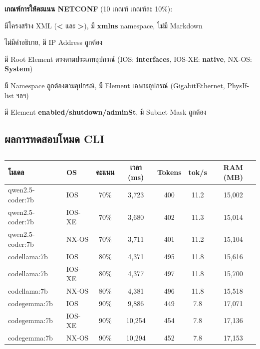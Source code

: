 \hspace*{1.3em}
\textbf{เกณฑ์การให้คะแนน NETCONF} (10 เกณฑ์ เกณฑ์ละ 10\%):
\begin{mycustomitem2}
    \item มีโครงสร้าง XML (\textbf{<} และ \textbf{>}), มี \textbf{xmlns} namespace, ไม่มี Markdown
    \item ไม่มีคำอธิบาย, มี IP Address ถูกต้อง
    \item มี Root Element ตรงตามประเภทอุปกรณ์ (IOS: \textbf{interfaces}, IOS-XE: \textbf{native}, NX-OS: \textbf{System})
    \item มี Namespace ถูกต้องตามอุปกรณ์, มี Element เฉพาะอุปกรณ์ (GigabitEthernet, PhysIf-list ฯลฯ)
    \item มี Element \textbf{enabled/shutdown/adminSt}, มี Subnet Mask ถูกต้อง
\end{mycustomitem2}

\subsection{ผลการทดสอบโหมด CLI}

\begin{table}[H]
    \caption{}
    \label{tab:benchmark-cli}
    \fontSixTeen
    \centering
    \begin{tabularx}{\textwidth}{|l|l|c|c|c|c|c|}
        \hline
        \textbf{โมเดล} & \textbf{OS} & \textbf{คะแนน} & \textbf{เวลา (ms)} & \textbf{Tokens} & \textbf{tok/s} & \textbf{RAM (MB)} \\
        \hline
        qwen2.5-coder:7b & IOS & 70\% & 3,723 & 400 & 11.2 & 15,002 \\
        \hline
        qwen2.5-coder:7b & IOS-XE & 70\% & 3,680 & 402 & 11.3 & 15,014 \\
        \hline
        qwen2.5-coder:7b & NX-OS & 70\% & 3,711 & 401 & 11.2 & 15,104 \\
        \hline
        codellama:7b & IOS & 80\% & 4,371 & 495 & 11.8 & 15,616 \\
        \hline
        codellama:7b & IOS-XE & 80\% & 4,377 & 497 & 11.8 & 15,700 \\
        \hline
        codellama:7b & NX-OS & 80\% & 4,381 & 496 & 11.8 & 15,518 \\
        \hline
        codegemma:7b & IOS & 90\% & 9,886 & 449 & 7.8 & 17,071 \\
        \hline
        codegemma:7b & IOS-XE & 90\% & 10,254 & 454 & 7.8 & 17,136 \\
        \hline
        codegemma:7b & NX-OS & 90\% & 10,294 & 452 & 7.8 & 17,153 \\
        \hline
    \end{tabularx}
\end{table}

